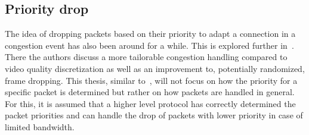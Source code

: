 \subsection{Priority drop}
The idea of dropping packets based on their priority to adapt a connection
in a congestion event has also been around for a while.
This is explored further in~\parencite{media-streaming-prio-drop}.
There the authors discuss a more tailorable congestion handling 
compared to video quality discretization as well as an improvement 
to, potentially randomized, frame dropping.
This thesis, similar to~\parencite{media-streaming-prio-drop}, will not focus
on how the priority for a specific packet is determined but rather on how
packets are handled in general.
For this, it is assumed that a higher level protocol has correctly determined 
the packet priorities and can handle the drop of packets with lower priority
in case of limited bandwidth.
